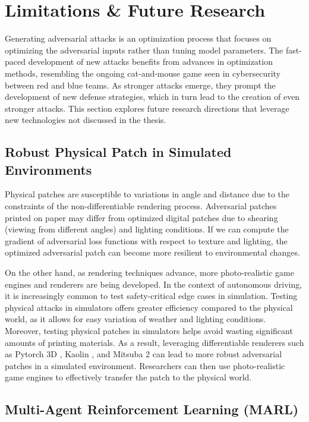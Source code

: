 \section{Limitations \& Future Research}

Generating adversarial attacks is an optimization process that focuses on optimizing the adversarial inputs rather than tuning model parameters. The fast-paced development of new attacks benefits from advances in optimization methods, resembling the ongoing cat-and-mouse game seen in cybersecurity between red and blue teams. As stronger attacks emerge, they prompt the development of new defense strategies, which in turn lead to the creation of even stronger attacks. This section explores future research directions that leverage new technologies not discussed in the thesis.

\subsection{Robust Physical Patch in Simulated Environments}

Physical patches are susceptible to variations in angle and distance due to the constraints of the non-differentiable rendering process. Adversarial patches printed on paper may differ from optimized digital patches due to shearing (viewing from different angles) and lighting conditions. If we can compute the gradient of adversarial loss functions with respect to texture and lighting, the optimized adversarial patch can become more resilient to environmental changes. 

On the other hand, as rendering techniques advance, more photo-realistic game engines and renderers are being developed. In the context of autonomous driving, it is increasingly common to test safety-critical edge cases in simulation. Testing physical attacks in simulators offers greater efficiency compared to the physical world, as it allows for easy variation of weather and lighting conditions. Moreover, testing physical patches in simulators helps avoid wasting significant amounts of printing materials. As a result, leveraging differentiable renderers such as Pytorch 3D \citep{ravi2020pytorch3d}, Kaolin \citep{KaolinLibrary}, and Mitsuba 2 \citep{nimier2019mitsuba} can lead to more robust adversarial patches in a simulated environment. Researchers can then use photo-realistic game engines to effectively transfer the patch to the physical world.

\subsection{Multi-Agent Reinforcement Learning (MARL)}

